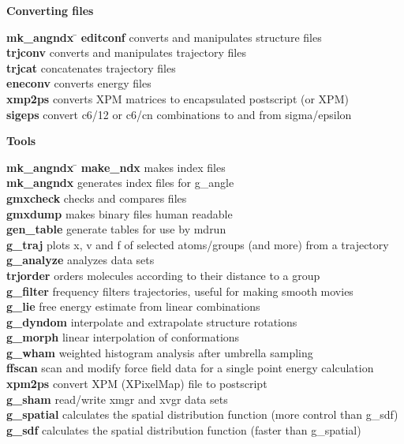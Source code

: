 \begin{description}
\item {\large\bf Converting files}
\vspace{-2ex}\begin{tabbing}
{\bf mk\_angndx} \= \kill
{\bf editconf} \> converts and manipulates structure files \\
{\bf trjconv} \> converts and manipulates trajectory files \\
{\bf trjcat} \> concatenates trajectory files \\
{\bf eneconv} \> converts energy files \\
{\bf xmp2ps} \> converts XPM matrices to encapsulated postscript (or XPM) \\
{\bf sigeps} \> convert c6/12 or c6/cn combinations to and from sigma/epsilon \\
\end{tabbing}\vspace{-2ex}

\item {\large\bf Tools}
\vspace{-2ex}\begin{tabbing}
{\bf mk\_angndx} \= \kill
{\bf make\_ndx} \> makes index files \\
{\bf mk\_angndx} \> generates index files for g\_angle \\
{\bf gmxcheck} \> checks and compares files \\
{\bf gmxdump} \> makes binary files human readable \\
{\bf gen\_table} \> generate tables for use by mdrun \\
{\bf g\_traj} \> plots x, v and f of selected atoms/groups (and more) from a trajectory \\
{\bf g\_analyze} \> analyzes data sets \\
{\bf trjorder} \> orders molecules according to their distance to a group \\
{\bf g\_filter} \> frequency filters trajectories, useful for making smooth movies \\
{\bf g\_lie} \> free energy estimate from linear combinations \\
{\bf g\_dyndom} \> interpolate and extrapolate structure rotations \\
{\bf g\_morph} \> linear interpolation of conformations  \\
{\bf g\_wham} \> weighted histogram analysis after umbrella sampling \\
{\bf ffscan} \> scan and modify force field data for a single point energy calculation \\
{\bf xpm2ps} \> convert XPM (XPixelMap) file to postscript \\
{\bf g\_sham} \> read/write xmgr and xvgr data sets \\
{\bf g\_spatial} \> calculates the spatial distribution function (more control than g\_sdf) \\
{\bf g\_sdf} \> calculates the spatial distribution function (faster than g\_spatial) \\
\end{tabbing}\vspace{-2ex}


\end{description}
